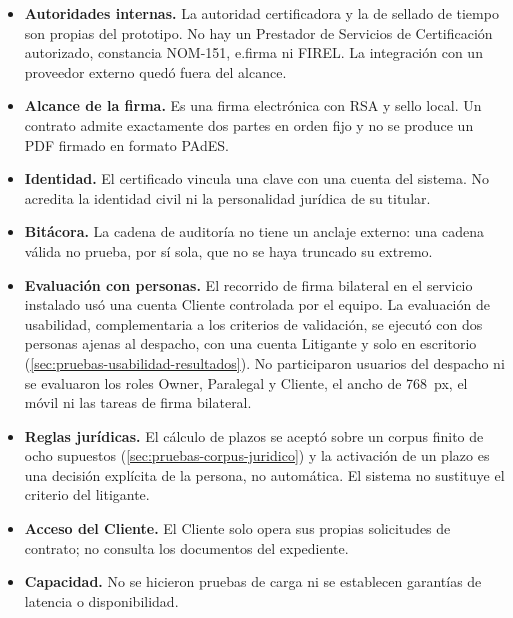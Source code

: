 \begin{itemize}
  \item \textbf{Autoridades internas.} La autoridad certificadora y la de
        sellado de tiempo son propias del prototipo. No hay un Prestador de
        Servicios de Certificación autorizado, constancia NOM-151, e.firma ni
        FIREL. La integración con un proveedor externo quedó fuera del alcance.
  \item \textbf{Alcance de la firma.} Es una firma electrónica con RSA y sello
        local. Un contrato admite exactamente dos partes en orden fijo y no se
        produce un PDF firmado en formato PAdES.
  \item \textbf{Identidad.} El certificado vincula una clave con una cuenta del
        sistema. No acredita la identidad civil ni la personalidad jurídica de
        su titular.
  \item \textbf{Bitácora.} La cadena de auditoría no tiene un anclaje externo:
        una cadena válida no prueba, por sí sola, que no se haya truncado su
        extremo.
  \item \textbf{Evaluación con personas.} El recorrido de firma bilateral en el
        servicio instalado usó una cuenta Cliente controlada por el equipo. La
        evaluación de usabilidad, complementaria a los criterios de
        validación, se ejecutó con dos personas ajenas al
        despacho, con una cuenta Litigante y solo en escritorio
        (\cref{sec:pruebas-usabilidad-resultados}). No participaron usuarios
        del despacho ni se evaluaron los roles Owner, Paralegal y Cliente,
        el ancho de 768~px, el móvil ni las tareas de firma bilateral.
  \item \textbf{Reglas jurídicas.} El cálculo de plazos se aceptó sobre un
        corpus finito de ocho supuestos (\cref{sec:pruebas-corpus-juridico}) y
        la activación de un plazo es una decisión explícita de la persona, no
        automática. El sistema no sustituye el criterio del litigante.
  \item \textbf{Acceso del Cliente.} El Cliente solo opera sus propias
        solicitudes de contrato; no consulta los documentos del expediente.
  \item \textbf{Capacidad.} No se hicieron pruebas de carga ni se establecen
        garantías de latencia o disponibilidad.
\end{itemize}
